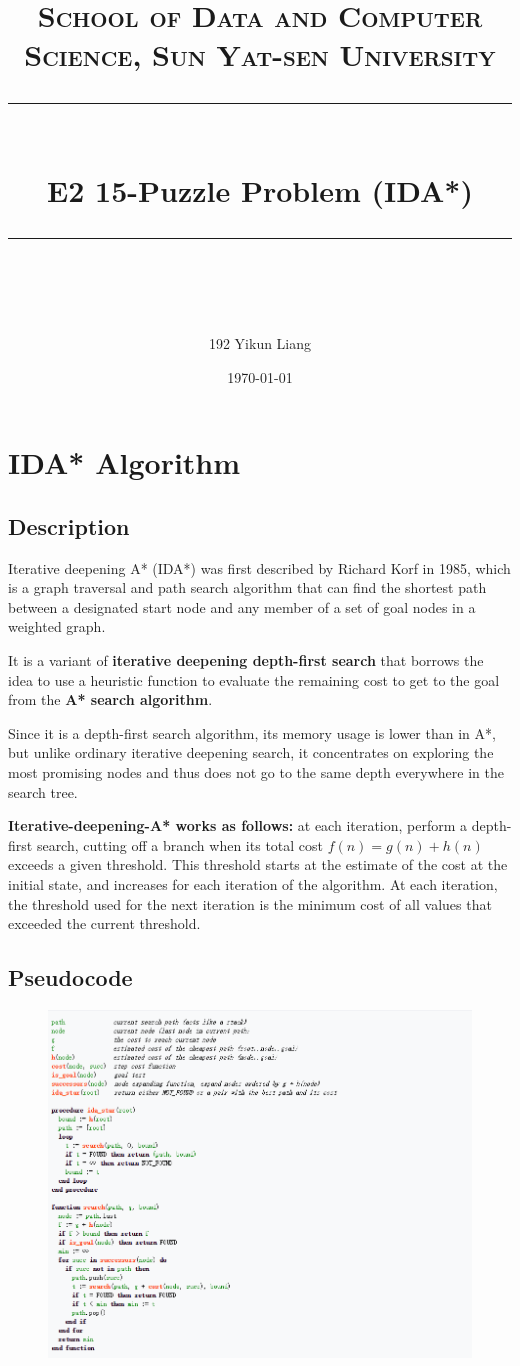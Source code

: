 \documentclass[a4paper, 11pt]{article}
\title{	
\normalfont \normalsize
\textsc{School of Data and Computer Science, Sun Yat-sen University} \\ [25pt] %
\rule{\textwidth}{0.5pt} \\[0.4cm] %
\huge  E2 15-Puzzle Problem (IDA*)\\ %
\rule{\textwidth}{2pt} \\[0.5cm] %
\author{192 Yikun Liang}
\date{\normalsize\today}
}
\begin{document}
\maketitle
\tableofcontents
\newpage

\section{IDA* Algorithm}
\subsection{Description}
Iterative deepening A* (IDA*) was first described by Richard Korf in 1985, which is a graph traversal and path search algorithm that can find the shortest path between a designated start node and any member of a set of goal nodes in a weighted graph.

It is a variant of \textbf{iterative deepening depth-first search} that borrows the idea to use a heuristic function to evaluate the remaining cost to get to the goal from the \textbf{A* search algorithm}.

Since it is a depth-first search algorithm, its memory usage is lower than in A*, but unlike ordinary iterative deepening search, it concentrates on exploring the most promising nodes and thus does not go to the same depth everywhere in the search tree.

\textbf{Iterative-deepening-A* works as follows:} at each iteration, perform a depth-first search, cutting off a branch when its total cost $f(n)=g(n)+h(n)$ exceeds a given threshold. This threshold starts at the estimate of the cost at the initial state, and increases for each iteration of the algorithm. At each iteration, the threshold used for the next iteration is the minimum cost of all values that exceeded the current threshold.
\subsection{Pseudocode}
\begin{figure}[ht]
\centering
\includegraphics[width=17.3cm]{Pic/code}
\end{figure}
\end{document}

